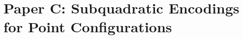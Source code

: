 \chapter{Paper C: Subquadratic Encodings for Point Configurations}
\label{chapter:order-type-encoding}







